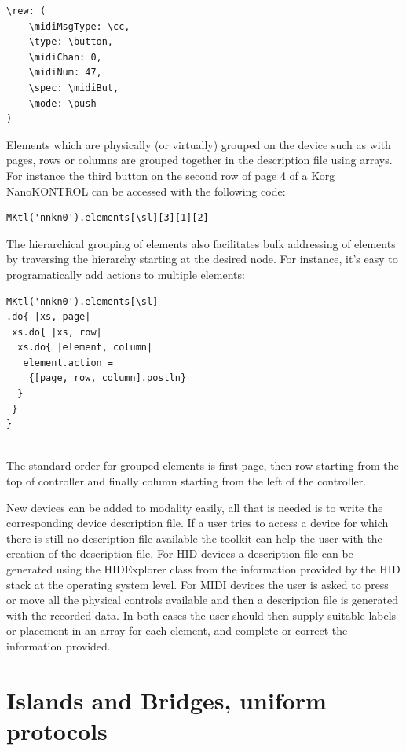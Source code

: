 \documentclass{article}
\begin{document}
\begin{Verbatim}
\rew: (
	\midiMsgType: \cc,
	\type: \button,
	\midiChan: 0,
	\midiNum: 47,
	\spec: \midiBut,
	\mode: \push
)
\end{Verbatim}

Elements which are physically (or virtually) grouped on the device such as with pages, rows or columns are grouped together in the description file using arrays. For instance the third button on the second row of page 4 of a Korg NanoKONTROL can be accessed with the following code:

\begin{Verbatim}
MKtl('nnkn0').elements[\sl][3][1][2]
\end{Verbatim}

The hierarchical grouping of elements also facilitates bulk addressing of elements by traversing the hierarchy starting at the desired node. For instance, it's easy to programatically add actions to multiple elements:

\begin{Verbatim}
MKtl('nnkn0').elements[\sl]
.do{ |xs, page|
 xs.do{ |xs, row|
  xs.do{ |element, column|
   element.action = 
    {[page, row, column].postln}
  }
 }
}
  		
\end{Verbatim}

The standard order for grouped elements is first page, then row starting from the top of controller and finally column starting from the left of the controller.

New devices can be added to modality easily, all that is needed is to write the corresponding device description file. If a user tries to access a device for which there is still no description file available the toolkit can help the user with the creation of the description file. For HID devices a description file can be generated using the HIDExplorer class from the information provided by the HID stack at the operating system level. For MIDI devices the user is asked to press or move all the physical controls available and then a description file is generated with the recorded data. In both cases the user should then supply suitable labels or placement in an array for each element, and complete or correct the information provided.





\section{Islands and Bridges, uniform protocols}
\label{sec:islands_and_bridges_uniform_protocols}
\end{document}
